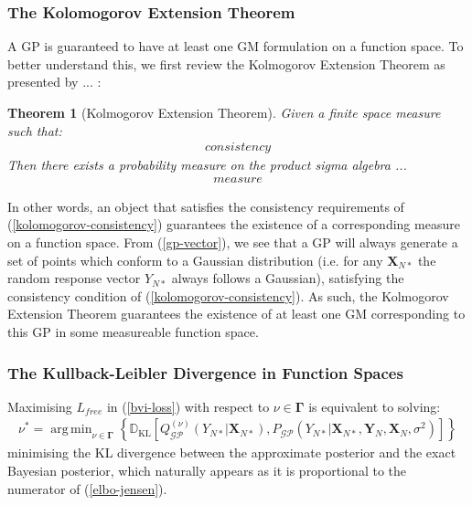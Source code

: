\documentclass{article}
\newtheorem{theorem}{Theorem}
\newcommand{\KLD}{\operatorname{\mathbb{D}_{KL}}}
\newcommand{\GP}{\operatorname{\mathcal{GP}}}
\DeclareMathOperator*{\argmin}{arg\,min}
\numberwithin{equation}{section}
\begin{document}
\subsubsection{The Kolomogorov Extension Theorem}
A GP is guaranteed to have at least one GM formulation on a function space. To better understand this, we first review the Kolmogorov Extension Theorem as presented by ... :
\begin{theorem}[Kolmogorov Extension Theorem]
\label{kolomogorov-extension-theorem}
Given a finite space measure such that:
\begin{align}
    consistency 
    \label{kolomogorov-consistency}
\end{align}
Then there exists a probability measure on the product sigma algebra ... 
\begin{align}
    measure
    \label{kolomogorov-measure}
\end{align}
\end{theorem}
In other words, an object that satisfies the consistency requirements of (\ref{kolomogorov-consistency}) guarantees the existence of a corresponding measure on a function space. From (\ref{gp-vector}), we see that a GP will always generate a set of points which conform to a Gaussian distribution (i.e. for any $\mathbf{X}_{N*}$ the random response vector $Y_{N*}$ always follows a Gaussian), satisfying the consistency condition of (\ref{kolomogorov-consistency}). As such, the Kolmogorov Extension Theorem guarantees the existence of at least one GM corresponding to this GP in some measureable function space. 

\subsubsection{The Kullback-Leibler Divergence in Function Spaces}
Maximising $L_{free}$ in (\ref{bvi-loss}) with respect to $\nu \in \mathbf{\Gamma}$ is equivalent to solving:
\begin{align}
    \nu^* = \argmin_{\nu \in \mathbf{\Gamma}} \left\{\KLD \left[ Q_{\GP}^{(\nu)}\left(Y_{N*} \vert \mathbf{X}_{N*}\right) ,  P_{\GP}\left(Y_{N*} \vert \mathbf{X}_{N*}, \mathbf{Y}_N, \mathbf{X}_N, \sigma^2 \right) \right]\right\}
    \label{elbo-kld}
\end{align}
minimising the KL divergence between the approximate posterior and the exact Bayesian posterior, which naturally appears as it is proportional to the numerator of (\ref{elbo-jensen}). 
\end{document}
